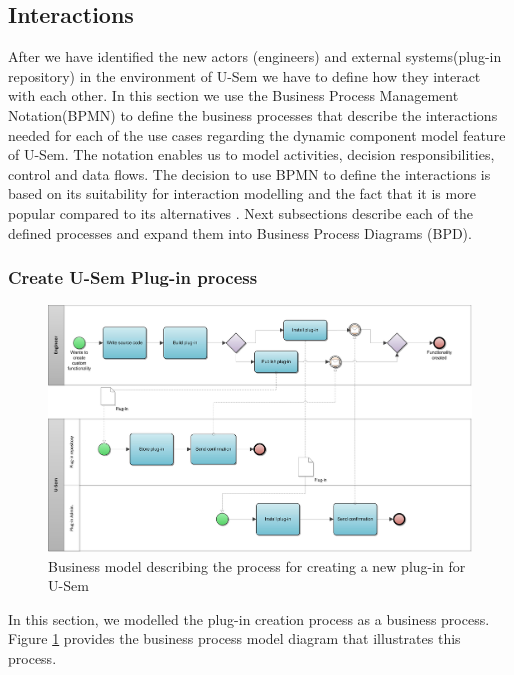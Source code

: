 \subsection{Interactions}

After we have identified the new actors (engineers) and external systems(plug-in repository) in the environment of U-Sem we have to define how they interact with each other. In this section we use the Business Process Management Notation(BPMN) \cite{wohed2006suitability} to define the business processes that describe the interactions needed for each of the use cases regarding the dynamic component model feature of U-Sem. The notation enables us to model activities, decision responsibilities, control and data flows. The decision to use BPMN to define the interactions is based on its suitability for interaction modelling and the fact that it is more popular compared to its alternatives \cite{decker2008interaction}. Next subsections describe each of the defined processes and expand them into Business Process Diagrams (BPD).

\subsubsection{Create U-Sem Plug-in process}

\begin{figure}[h!]
  \centering
  	\includegraphics[scale=0.75,angle=270]{plug-in/business_processes/CreatePlugInBusinessModel.jpg}
  \caption{Business model describing the process for creating a new plug-in for U-Sem}
  \label{fig_install_bpm}
\end{figure}

In this section, we modelled the plug-in creation process as a business process. Figure \ref{fig_install_bpm} provides the business process model diagram that illustrates this process. 

